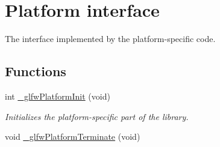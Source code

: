 \hypertarget{group__platform}{}\section{Platform interface}
\label{group__platform}


The interface implemented by the platform-\/specific code.  


\subsection*{Functions}
\begin{DoxyCompactItemize}
\item 
int \hyperlink{group__platform_gaaed0c9f6d4944cc993516fa1fe112101}{\+\_\+glfw\+Platform\+Init} (void)
\begin{DoxyCompactList}\small\item\em Initializes the platform-\/specific part of the library. \end{DoxyCompactList}\item 
\hypertarget{group__platform_ga7a957eb71af07a553a88382f860a5fdc}{}void \hyperlink{group__platform_ga7a957eb71af07a553a88382f860a5fdc}{\+\_\+glfw\+Platform\+Terminate} (void)\label{group__platform_ga7a957eb71af07a553a88382f860a5fdc}


\end{DoxyCompactItemize}
